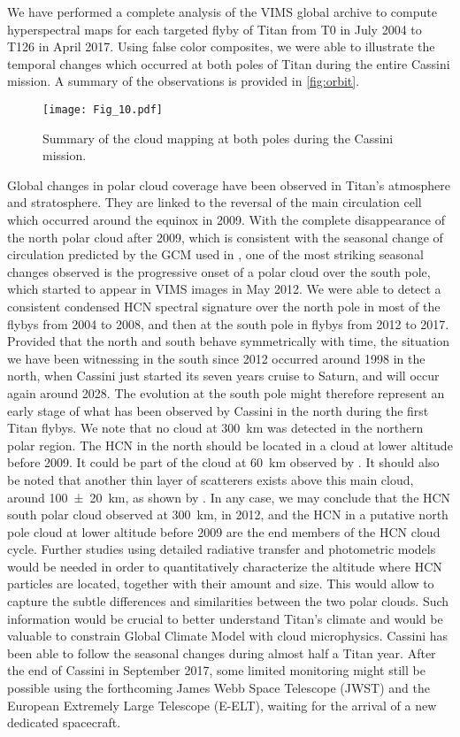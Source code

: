 \documentclass[preprint,twocolumn,5p,authoryear,compress,colorlinks=true]{elsarticle}
\newcommand{\figref}[1]{\autoref{fig:#1}}
\begin{document}
We have performed a complete analysis of the VIMS global archive to compute hyperspectral maps for each targeted flyby of Titan from T0 in July 2004 to T126 in April 2017. Using false color composites, we were able to illustrate the temporal changes which occurred at both poles of Titan during the entire Cassini mission. A summary of the observations is provided in \figref{orbit}.

\begin{figure*}[!ht]
\texttt{[image: Fig\_10.pdf]}
\caption{Summary of the cloud mapping at both poles during the Cassini mission.}
\label{fig:orbit}
\end{figure*}

Global changes in polar cloud coverage have been observed in Titan's atmosphere and stratosphere. They are linked to the reversal of the main circulation cell which occurred around the equinox in 2009. With the complete disappearance of the north polar cloud after 2009, which is consistent with the seasonal change of circulation predicted by the GCM used in \cite{Rannou2006}, one of the most striking seasonal changes observed is the progressive
onset of a polar cloud over the south pole, which started to appear in VIMS images in May 2012. We were able to detect a consistent condensed HCN spectral signature over the north pole in most of the flybys from 2004 to 2008, and then at the south pole in flybys from 2012 to 2017. Provided that the north and south behave symmetrically with time, the situation we have been witnessing in the south since 2012 occurred around 1998 in the north, when Cassini just started its seven years cruise to Saturn, and will occur again around 2028.
The evolution at the south pole might therefore represent an early stage of what has been observed by Cassini in the north during the first Titan flybys. We note that no cloud at \SI{300}{km} was detected in the northern polar region. The HCN in the north should be located in a cloud at lower altitude before 2009. It could be part of the cloud at \SI{60}{km} observed by \cite{Griffith2006,LeMouelic2012}.
It should also be noted that another thin layer of scatterers exists above this main cloud, around \SI{100(20)}{km}, as shown by \cite{Rannou2012}. In any case, we may conclude that the HCN south polar cloud observed at \SI{300}{km}, in 2012, and the HCN in a putative north pole cloud at lower altitude before 2009 are the end members of the HCN cloud cycle. Further studies using detailed radiative transfer and photometric models would be needed in order to quantitatively characterize the altitude where HCN particles are located, together with their amount and size. This would allow to capture the subtle differences and similarities between the two polar clouds. Such information would be crucial to better understand Titan's climate and would be valuable to constrain Global Climate Model with cloud microphysics. Cassini has been able to follow the seasonal changes during almost half a Titan year. After the end of Cassini in September 2017, some limited monitoring might still be possible using the forthcoming James Webb Space Telescope (JWST) and the European Extremely Large Telescope (E-ELT), waiting for the arrival of a new dedicated spacecraft.
\end{document}
